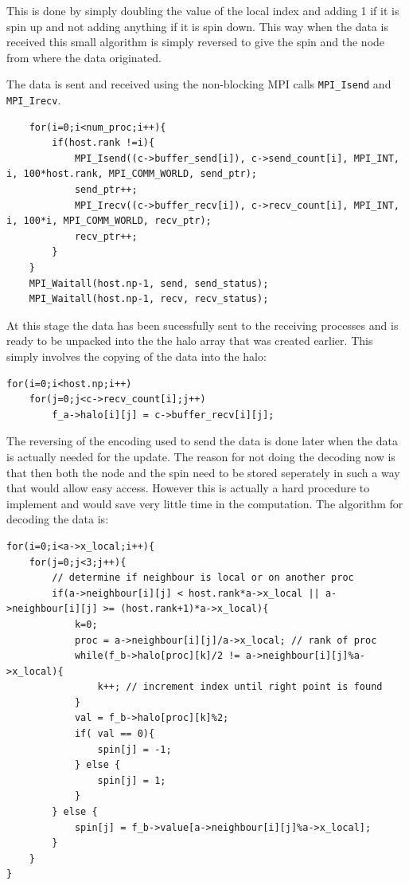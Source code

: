 \documentclass[pdftex,12pt,a4paper]{article}
\begin{document}
This is done by simply doubling the value of the local index and adding 1 if it is spin up and not adding anything if it is spin down. This way when the data is received this small algorithm is simply reversed to give the spin and the node from where the data originated.

The data is sent and received using the non-blocking MPI calls \verb|MPI_Isend| and \verb|MPI_Irecv|. 

\begin{lstlisting}
	for(i=0;i<num_proc;i++){
		if(host.rank !=i){
			MPI_Isend((c->buffer_send[i]), c->send_count[i], MPI_INT, i, 100*host.rank, MPI_COMM_WORLD, send_ptr);
			send_ptr++;
			MPI_Irecv((c->buffer_recv[i]), c->recv_count[i], MPI_INT, i, 100*i, MPI_COMM_WORLD, recv_ptr);
			recv_ptr++;
		}
	}
	MPI_Waitall(host.np-1, send, send_status);
	MPI_Waitall(host.np-1, recv, recv_status);
\end{lstlisting}

At this stage the data has been sucessfully sent to the receiving processes and is ready to be unpacked into the the halo array that was created earlier. This simply involves the copying of the data into the halo:

\begin{lstlisting}
for(i=0;i<host.np;i++)
	for(j=0;j<c->recv_count[i];j++)
		f_a->halo[i][j] = c->buffer_recv[i][j];
\end{lstlisting}

The reversing of the encoding used to send the data is done later when the  data is actually needed for the update. The reason for not doing the decoding now is that then both the node and the spin need to be stored seperately in such a way that would allow easy access. However this is actually a hard procedure to implement and would save very little time in the computation. The algorithm for decoding the data is:

\begin{lstlisting}
for(i=0;i<a->x_local;i++){
	for(j=0;j<3;j++){
		// determine if neighbour is local or on another proc
		if(a->neighbour[i][j] < host.rank*a->x_local || a->neighbour[i][j] >= (host.rank+1)*a->x_local){
			k=0; 	
			proc = a->neighbour[i][j]/a->x_local; // rank of proc
			while(f_b->halo[proc][k]/2 != a->neighbour[i][j]%a->x_local){
				k++; // increment index until right point is found
			}
			val = f_b->halo[proc][k]%2;
			if( val == 0){
				spin[j] = -1;
			} else {
				spin[j] = 1;
			}
		} else { 
			spin[j] = f_b->value[a->neighbour[i][j]%a->x_local];
		}
	}
}
\end{lstlisting}
\end{document}
